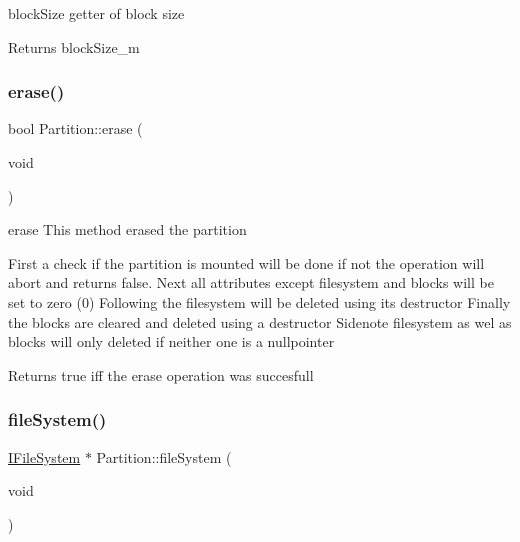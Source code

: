 block\+Size getter of block size 

\begin{DoxyReturn}{Returns}
block\+Size\+\_\+m 
\end{DoxyReturn}
\mbox{\label{classcore_1_1logic_1_1_partition_a43ea90c84d2d9b90e665efbc06d5d626}} 
\subsubsection{\texorpdfstring{erase()}{erase()}}
{\footnotesize\ttfamily bool Partition\+::erase (\begin{DoxyParamCaption}\item[{void}]{ }\end{DoxyParamCaption})}



erase This method erased the partition 

First a check if the partition is mounted will be done if not the operation will abort and returns false. Next all attributes except filesystem and blocks will be set to zero (0) Following the filesystem will be deleted using its destructor Finally the blocks are cleared and deleted using a destructor Sidenote filesystem as wel as blocks will only deleted if neither one is a nullpointer \begin{DoxyReturn}{Returns}
true iff the erase operation was succesfull 
\end{DoxyReturn}
\mbox{\label{classcore_1_1logic_1_1_partition_a37dd86b3bc84bc1c7463beaf6d3adc57}} 
\subsubsection{\texorpdfstring{file\+System()}{fileSystem()}}
{\footnotesize\ttfamily \mbox{\hyperlink{classcore_1_1_i_file_system}{I\+File\+System}} $\ast$ Partition\+::file\+System (\begin{DoxyParamCaption}\item[{void}]{ }\end{DoxyParamCaption})}



